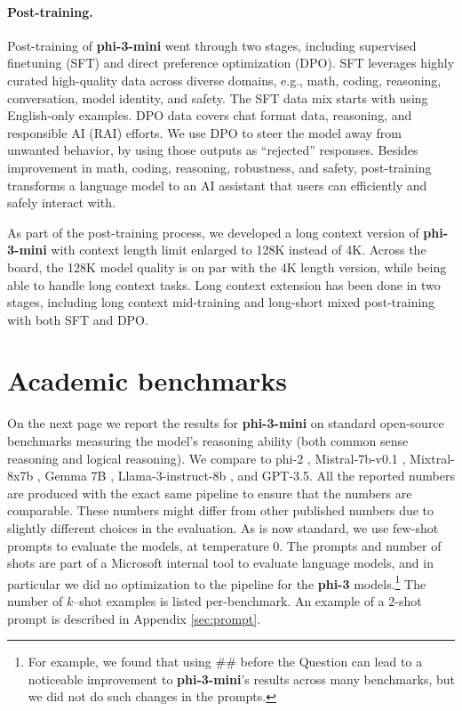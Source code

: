 \documentclass[11pt]{article}
\begin{document}
\paragraph{Post-training.}
Post-training of \textbf{phi-3-mini} went through  two stages, including supervised finetuning (SFT) and direct preference  optimization (DPO). SFT leverages highly curated  high-quality data across diverse domains, e.g., math, coding, reasoning, conversation, model identity, and safety. The SFT data mix starts with using English-only examples. DPO data covers chat format data, reasoning, and responsible AI (RAI) efforts. We use DPO to steer the model away from unwanted behavior, by using those outputs as “rejected” responses. Besides improvement in math, coding, reasoning, robustness, and safety, post-training transforms a language model to an AI assistant that users can efficiently and safely interact with.

As part of the post-training process, we  developed a long context version of \textbf{phi-3-mini} with context length limit enlarged to 128K instead of 4K. Across the  board, the 128K model quality is on par with the 4K length version, while being able to handle long context tasks. Long context extension has been done in two stages, including long context mid-training and long-short mixed post-training with both SFT and DPO. 



\section{Academic benchmarks}

On the next page we report the results for \textbf{phi-3-mini} on standard open-source benchmarks measuring the model's reasoning ability (both common sense reasoning and logical reasoning). We compare to phi-2 \cite{javaheripi2023phi}, Mistral-7b-v0.1 \cite{jiang2023mistral}, Mixtral-8x7b \cite{jiang2024mixtral}, Gemma 7B \cite{gemmateam2024gemma}, Llama-3-instruct-8b \cite{llama3}, and GPT-3.5. All the reported numbers are produced with the exact same pipeline to ensure that the numbers are comparable. These numbers might differ from other published numbers due to slightly different choices in the evaluation. As is now standard, we use few-shot prompts to evaluate the models, at temperature $0$. The prompts and number of shots are part of a Microsoft internal tool to evaluate language models, and in particular we did no optimization to the pipeline for the \textbf{phi-3} models.\footnote{For example, we found that using \#\# before the Question can lead to a noticeable improvement to \textbf{phi-3-mini}'s results across many benchmarks, but we did not do such changes in the prompts.} 
The number of $k$--shot examples is listed per-benchmark. 
An example of a 2-shot prompt is described in Appendix \ref{sec:prompt}.
\end{document}
